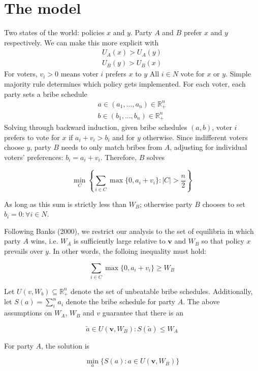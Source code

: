 \documentclass[12pt,a4paper]{article}
\begin{document}
\section{The model}

Two states of the world: policies $x$ and $y$. Party $A$ and $B$ prefer $x$ and $y$ respectively. We can make this more explicit with
\begin{align*}
    U_A(x) > U_A(y)\\
    U_B(y) > U_B(x)
\end{align*}
For voters, $v_i > 0$ means voter $i$ prefers $x$ to $y$ All $i \in N$ vote for $x$ or $y$. Simple majority rule determines which policy gets implemented. For each voter, each party sets a bribe schedule
\begin{align*}
    a \in (a_1, ..., a_n) \in \mathbb{R}^n_+\\
    b \in (b_1, ..., b_n) \in \mathbb{R}^n_+
\end{align*}
Solving through backward induction, given bribe schedules $(a,b)$, voter $i$ prefers to vote for $x$ if $a_i + v_i > b_i$ and for $y$ otherwise. Since indifferent voters choose $y$, party $B$ needs to only match bribes from $A$, adjusting for individual voters' preferences: $b_i = a_i + v_i$. Therefore, $B$ solves

$$\min_C \left\{\sum_{i \in C} \max\{0, a_i + v_i\} : |C| > \frac{n}{2} \right\}$$

As long as this sum is strictly less than $W_B$; otherwise party $B$ chooses to set $b_i = 0 : \forall i \in N$.

Following Banks (2000), we restrict our analysis to the set of equilibria in which party $A$ wins, i.e. $W_A$ is sufficiently large relative to $\mathbf{v}$ and $W_B$ so that policy $x$ prevails over $y$. In other words, the folloing inequality must hold:

$$ \sum_{i \in C} \max\{0, a_i + v_i\} \geq W_B$$

Let $U(v, W_b) \subseteq \mathbb{R}^n_+$ denote the set of unbeatable bribe schedules. Additionally, let $S(a) = \sum^n_i a_i$ denote the bribe schedule for party $A$. The above assumptions on $W_A$, $W_B$ and $v$ guarantee that there is an

$$\tilde{a} \in U(\mathbf{v}, W_B) : S(\tilde{a}) \leq W_A$$

For party $A$, the solution is

\begin{equation}
\label{eqn:solution}
\min_a\{S(a) : a \in U(\mathbf{v}, W_B) \}
\end{equation}
\end{document}
